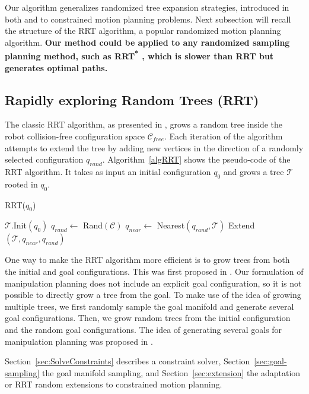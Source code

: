 \documentclass{article}
\begin{document}
Our algorithm generalizes randomized tree expansion strategies, introduced in both \cite{HsuLat99c} and
\cite{kuffner00rrtconnect} to constrained motion planning problems. Next subsection will recall the structure of the RRT algorithm,
a popular randomized motion planning algorithm. 
{\bf Our method could be applied to any randomized sampling planning method, such
as RRT\textsuperscript{*} \cite{Karaman01062011}, which is slower than RRT but generates optimal
paths.}


\subsection{Rapidly exploring Random Trees (RRT)}

The classic RRT algorithm, as presented in  \cite{kuffner00rrtconnect}, grows 
a random tree inside the robot 
collision-free configuration space 
$\mathcal{C}_{free}$. Each iteration of the algorithm attempts to extend the tree
by adding new vertices in the direction of a randomly selected configuration
$q_{rand}$. Algorithm~\ref{algRRT} shows the pseudo-code of the RRT algorithm.
It takes as input an initial configuration $q_0$ and grows a tree  $\mathcal{T}$ rooted 
in $q_0$. 

\begin{algorithm}
\caption{RRT($q_0$)}
\label{algRRT}
\begin{algorithmic}
\STATE $\mathcal{T}.$Init$(q_0)$
\STATE $q_{rand} \leftarrow $ Rand$(\mathcal{C})$
\STATE $q_{near} \leftarrow $ Nearest$(q_{rand},\mathcal{T})$
\STATE Extend$(\mathcal{T},q_{near},q_{rand})$
\ENDFOR

\end{algorithmic}
\end{algorithm}

One way to make the RRT algorithm more efficient is to grow trees from both the initial
and  goal configurations. This was first proposed in 
\cite{kuffner00rrtconnect}. Our formulation of manipulation planning does
not include an explicit goal configuration, so it is not possible to directly grow
a tree from the goal. To make use of the idea of growing multiple trees, we first
randomly sample the goal manifold and generate several goal configurations. Then, 
we grow random
trees from the initial configuration and the random goal configurations. The idea of
generating several goals for manipulation planning was proposed in \cite{diankov2008bpc}.

Section~\ref{sec:SolveConstraints} describes a constraint solver,
Section~\ref{sec:goal-sampling} the goal manifold sampling, and
Section~\ref{sec:extension} the adaptation or RRT random extensions to
constrained motion planning.
\end{document}
